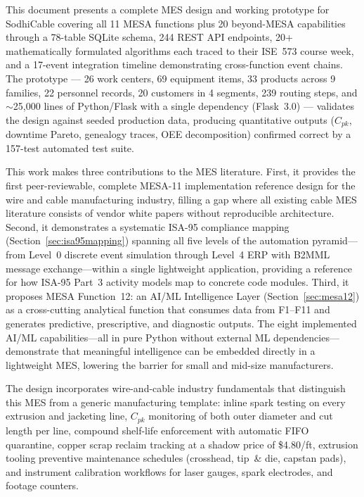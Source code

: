 \documentclass[11pt]{article}
\begin{document}
This document presents a complete MES design and working prototype for SodhiCable covering all 11 MESA functions plus 20 beyond-MESA capabilities through a 78-table SQLite schema, 244 REST API endpoints, 20+ mathematically formulated algorithms each traced to their ISE~573 course week, and a 17-event integration timeline demonstrating cross-function event chains.  The prototype --- 26 work centers, 69 equipment items, 33 products across 9 families, 22 personnel records, 20 customers in 4 segments, 239 routing steps, and ${\sim}$25{,}000 lines of Python/Flask with a single dependency (Flask~3.0) --- validates the design against seeded production data, producing quantitative outputs ($C_{pk}$, downtime Pareto, genealogy traces, OEE decomposition) confirmed correct by a 157-test automated test suite.

This work makes three contributions to the MES literature.  First, it provides the first peer-reviewable, complete MESA-11 implementation reference design for the wire and cable manufacturing industry, filling a gap where all existing cable MES literature consists of vendor white papers without reproducible architecture.  Second, it demonstrates a systematic ISA-95 compliance mapping (Section~\ref{sec:isa95mapping}) spanning all five levels of the automation pyramid---from Level~0 discrete event simulation through Level~4 ERP with B2MML message exchange---within a single lightweight application, providing a reference for how ISA-95 Part~3 activity models map to concrete code modules.  Third, it proposes MESA Function~12: an AI/ML Intelligence Layer (Section~\ref{sec:mesa12}) as a cross-cutting analytical function that consumes data from F1--F11 and generates predictive, prescriptive, and diagnostic outputs.  The eight implemented AI/ML capabilities---all in pure Python without external ML dependencies---demonstrate that meaningful intelligence can be embedded directly in a lightweight MES, lowering the barrier for small and mid-size manufacturers.

The design incorporates wire-and-cable industry fundamentals that distinguish this MES from a generic manufacturing template: inline spark testing on every extrusion and jacketing line, $C_{pk}$ monitoring of both outer diameter and cut length per line, compound shelf-life enforcement with automatic FIFO quarantine, copper scrap reclaim tracking at a shadow price of \$4.80/ft, extrusion tooling preventive maintenance schedules (crosshead, tip~\& die, capstan pads), and instrument calibration workflows for laser gauges, spark electrodes, and footage counters.
\end{document}
